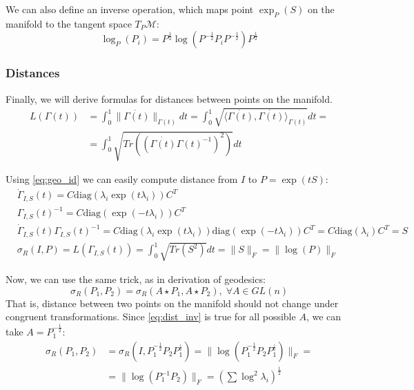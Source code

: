 \documentclass[12pt]{extarticle}
\theoremstyle{definition}
\theoremstyle{remark}
\begin{document}
	We can also define an inverse operation, which maps point $ \exp_P(S) $ on the manifold to the tangent space $T_P\mathcal{M}$:
	\begin{equation*}
	\log_P(P_i) = P^{\frac12}  \log (P^{-\frac12}P_i P^{-\frac12}) P^{\frac12}
	\end{equation*}
	
	
	\subsubsection*{Distances}
	Finally, we will derive formulas for distances between points on the manifold. 
	\begin{align*}
	L(\Gamma(t)) & = \int_{0}^{1} \|\dot{\Gamma(t)}\|_{\Gamma(t)}dt =  \int_{0}^{1}\sqrt{\langle \dot{\Gamma(t)}, \dot{\Gamma(t)} \rangle_{\Gamma(t)}}dt = \\
	& =   \int_{0}^{1}\sqrt{Tr\left( (\dot{\Gamma(t)}\Gamma(t)^{-1})^2 \right) }dt
	\end{align*}
	
	Using \cref{eq:geo_id} we can easily compute distance from $I$ to $P = \exp(tS)$:
	\begin{align*}
	&\dot{\Gamma}_{I,S}(t) = C\text{diag}(\lambda_i\exp(t \lambda_i))C^T \\
	&\Gamma_{I,S}(t)^{-1} = C\text{diag}(\exp( - t \lambda_i))C^T \\
	&    \dot{\Gamma}_{I,S}(t)\Gamma_{I,S}(t)^{-1} = C\text{diag}(\lambda_i\exp(t \lambda_i))\text{diag}(\exp( - t \lambda_i))C^T =C\text{diag}(\lambda_i) C^T = S\\    
	&\sigma_R (I, P) =L(\Gamma_{I,S}(t)) = \int_{0}^{1}\sqrt{Tr\left( S^2 \right) }dt = \|S\|_F = \|\log(P)\|_F
	\end{align*}
	
	Now, we can use the same trick, as in derivation of geodesics:
	\begin{equation}\label{eq:dist_inv}
	\sigma_R(P_1,P_2)  = \sigma_R(A\star P_1, A\star P_2), \; \forall A \in GL(n)
	\end{equation}
	That is, distance between two points on the manifold should not change under congruent transformations. Since \cref{eq:dist_inv} is true for all possible $A$, we can take $A = P_1^{-\frac12}$:
	\begin{equation}\label{eq:dist}
	\begin{split}
	\sigma_R(P_1, P_2) &= \sigma_R(I, P_1^{-\frac12}P_2P_1^{_\frac12}) = \|\log (P_1^{-\frac12}P_2P_1^{_\frac12})\|_F=\\&= \|\log(P_1^{-1}P_2)\|_F = \left( \sum \log^2\lambda_i \right)^{\frac12} 
	\end{split}
	\end{equation}
	
\end{document}
